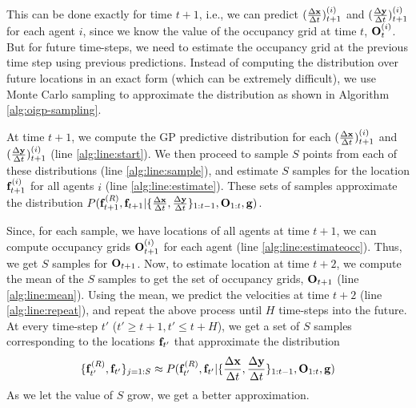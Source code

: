 This can be done exactly for time $t+1$, i.e., we can predict
$(\frac{\Delta \mathbf{x}}{\Delta t})_{t+1}^{(i)}$ and $(\frac{\Delta \mathbf{y}}{\Delta t})_{t+1}^{(i)}$ for each agent $i$,
since we know the value of the occupancy grid at time $t$,
$\mathbf{O}^{(i)}_t$. But for future time-steps, we need to estimate the
occupancy grid at the previous time step using previous
predictions. Instead of computing the distribution over future
locations in an exact form (which can be extremely difficult), we use
Monte Carlo sampling to approximate the distribution as shown in
Algorithm \ref{alg:oigp-sampling}.

At time $t+1$, we compute the GP predictive distribution
\cite{rasmussen06} for each $(\frac{\Delta \mathbf{x}}{\Delta t})_{t+1}^{(i)}$ and
$(\frac{\Delta \mathbf{y}}{\Delta t})_{t+1}^{(i)}$ (line \ref{alg:line:start}).
%
%
%
%
%
We then proceed to sample $S$ points from each of these distributions
(line \ref{alg:line:sample}), and estimate $S$ samples for the
location $\mathbf{f}_{t+1}^{(i)}$ for all agents $i$ (line
\ref{alg:line:estimate}).  These sets of samples approximate the
distribution
$P(\mathbf{f}^{(R)}_{t+1}, \mathbf{f}_{t+1}|\{\frac{\Delta \mathbf{x}}{\Delta t}, \frac{\Delta \mathbf{y}}{\Delta t}\}_{1:t-1},
\mathbf{O}_{1:t}, \mathbf{g})$.

Since, for each sample, we have locations of all agents at time $t+1$,
we can compute occupancy grids $\mathbf{O}^{(i)}_{t+1}$ for each agent
(line \ref{alg:line:estimateocc}). Thus, we get $S$ samples for
$\mathbf{O}_{t+1}$.  Now, to estimate location at time $t+2$, we compute
the mean of the $S$ samples to get the set of occupancy grids,
$\mathbf{O}_{t+1}$ (line \ref{alg:line:mean}).  Using the mean,
%
we predict the velocities at time $t+2$ (line \ref{alg:line:repeat}),
and repeat the above process until $H$ time-steps into the future. At
every time-step $t'$ ($t' \geq t+1, t' \leq t+H$), we get a set of $S$
samples corresponding to the locations $\mathbf{f}_{t'}$ that approximate
the distribution
\begin{align*}
  \{\mathbf{f}^{(R)}_{t'}, \mathbf{f}_{t'}\}_{j=1:S} \approx P(\mathbf{f}^{(R)}_{t'}, \mathbf{f}_{t'}|\{\frac{\Delta \mathbf{x}}{\Delta t}, \frac{\Delta \mathbf{y}}{\Delta t}\}_{1:t-1}, \mathbf{O}_{1:t}, \mathbf{g})
\end{align*}
As we let the value of $S$ grow, we get a better approximation.


